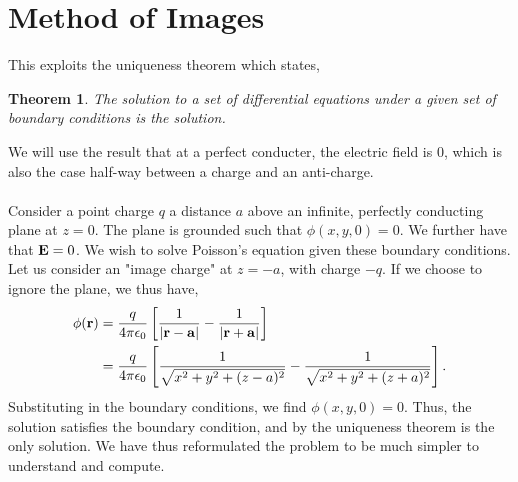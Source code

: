 \documentclass{book}
\newtheorem*{theorem}{Theorem}
\begin{document}
\section{Method of Images}
This exploits the uniqueness theorem which states,
\begin{theorem}
	The solution to a set of differential equations under a given set of boundary conditions is the solution.
\end{theorem}
We will use the result that at a perfect conducter, the electric field is 0, which is also the case half-way between a charge and an anti-charge.
\\\\
Consider a point charge $q$ a distance $a$ above an infinite, perfectly conducting plane at $z = 0$. The plane is grounded such that $\phi(x,y,0) = 0$. We further have that $\vb{E} = 0$. We wish to solve Poisson's equation given these boundary conditions. Let us consider an "image charge" at $z = -a$, with charge $-q$. If we choose to ignore the plane, we thus have,
\begin{equation}
	\begin{split}
	\phi(\vb{r}) & = \frac{q}{4\pi\epsilon_0}\left[\frac{1}{|\vb{r}-\vb{a}|} - \frac{1}{|\vb{r} + \vb{a}|}\right] \\
	& = \frac{q}{4\pi\epsilon_0} \left[\frac{1}{\sqrt{x^2 + y^2 + (z-a)^2}}- \frac{1}{\sqrt{x^2 + y^2 + (z+a)^2}}\right].
	\end{split}
\end{equation} 
Substituting in the boundary conditions, we find $\phi(x,y,0) = 0$. Thus, the solution satisfies the boundary condition, and by the uniqueness theorem is the only solution. We have thus reformulated the problem to be much simpler to understand and compute.
\end{document}
